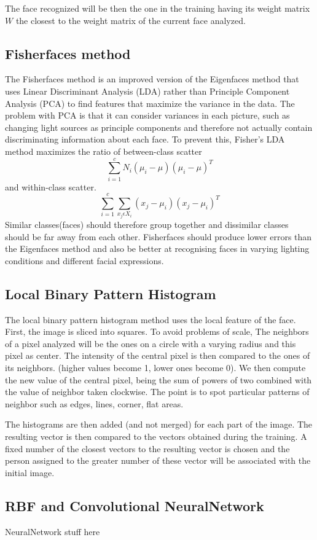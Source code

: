 The face recognized will be then the one in the training having its weight matrix $W$ the closest to the weight matrix of the current face analyzed. 

\subsection{Fisherfaces method}

The Fisherfaces method is an improved version of the Eigenfaces method that uses Linear Discriminant Analysis (LDA) rather than Principle Component Analysis (PCA) to find features that maximize the variance in the data. The problem with PCA is that it can consider variances in each picture, such as changing light sources as principle components and therefore not actually contain discriminating information about each face. To prevent this, Fisher's LDA method maximizes the ratio of between-class scatter 
\begin{equation}
	\sum\limits_{i=1}^{c}N_{i}(\mu_{i}-\mu)(\mu_{i}-\mu)^T
\end{equation}
and within-class scatter.
\begin{equation}
	\sum\limits_{i=1}^{c}\sum\limits_{x_{j}\epsilon X_{i}}^{}(x_{j}-\mu_{i})(x_{j}-\mu_{i})^T
\end{equation}
Similar classes(faces) should therefore group together and dissimilar classes should be far away from each other.
Fisherfaces should produce lower errors than the Eigenfaces method and also be better at recognising faces in varying lighting conditions and different facial expressions.

\subsection{Local Binary Pattern Histogram}

The local binary pattern histogram method uses the local feature of the face. First, the image is sliced into squares.
To avoid problems of scale, The neighbors of a pixel analyzed will be the ones on a circle with a varying radius and this pixel as center.
The intensity of the central pixel is then compared to the ones of its neighbors. (higher values become 1, lower ones become 0).
We then compute the new value of the central pixel, being the sum of powers of two combined with the value of neighbor taken clockwise. The point is to spot particular patterns of neighbor such as edges, lines, corner, flat areas.


The histograms are then added (and not merged) for each part of the image. The resulting vector is then compared to the vectors obtained during the training. A fixed number of the closest vectors to the resulting vector is chosen and the person assigned to the greater number of these vector will be associated with the initial image.


\subsection{RBF and Convolutional NeuralNetwork}

NeuralNetwork stuff here
